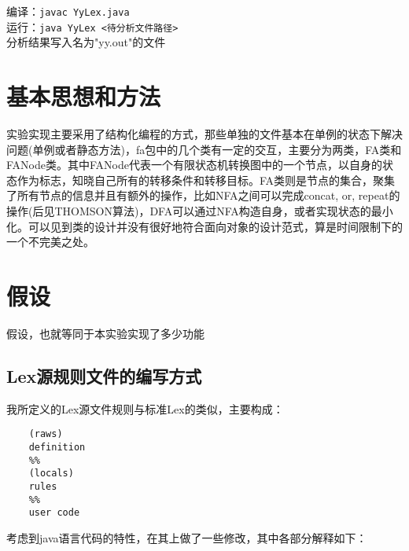 \documentclass[a4paper]{ctexart} %
\begin{document}
	编译：\verb|javac YyLex.java|\\
	运行：\verb|java YyLex <待分析文件路径>|\\
	分析结果写入名为"yy.out"的文件

	\section{基本思想和方法}

	实验实现主要采用了结构化编程的方式，那些单独的文件基本在单例的状态下解决问题(单例或者静态方法)，fa包中的几个类有一定的交互，主要分为两类，FA类和FANode类。其中FANode代表一个有限状态机转换图中的一个节点，以自身的状态作为标志，知晓自己所有的转移条件和转移目标。FA类则是节点的集合，聚集了所有节点的信息并且有额外的操作，比如NFA之间可以完成concat, or, repeat的操作(后见THOMSON算法)，DFA可以通过NFA构造自身，或者实现状态的最小化。可以见到类的设计并没有很好地符合面向对象的设计范式，算是时间限制下的一个不完美之处。

	\section{假设}
	假设，也就等同于本实验实现了多少功能

	\subsection{Lex源规则文件的编写方式}

	我所定义的Lex源文件规则与标准Lex的类似，主要构成：

	\begin{verbatim}
	(raws)
	definition
	%%
	(locals)
	rules
	%%
	user code
	\end{verbatim}

	考虑到java语言代码的特性，在其上做了一些修改，其中各部分解释如下：
\end{document}
